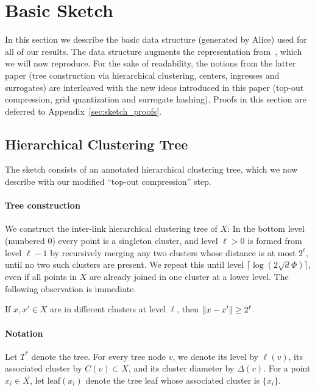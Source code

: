 
\section{Basic Sketch}\label{sec:sketch}

In this section we describe the basic data structure (generated by Alice) used for all of our results.
The data structure augments the representation from~\cite{indyk2017near}, which we will now reproduce.
For the sake of readability, the notions from the latter paper (tree construction via hierarchical clustering, centers, ingresses and surrogates) are interleaved with the new ideas introduced in this paper (top-out compression, grid quantization and surrogate hashing).
Proofs in this section are deferred to Appendix~\ref{sec:sketch_proofs}.


\subsection{Hierarchical Clustering Tree}
The sketch consists of an annotated hierarchical clustering tree, which we now describe with our modified ``top-out compression'' step.

\paragraph{Tree construction}
We construct the inter-link hierarchical clustering tree of $X$: In the bottom level (numbered $0$) every point is a singleton cluster, and level $\ell>0$ is formed from level $\ell-1$ by recursively merging any two clusters whose distance is at most $2^\ell$, until no two such clusters are present.
We repeat this until level $\lceil\log(2\sqrt d\Phi)\rceil$, even if all points in $X$ are already joined in one cluster at a lower level.
The following observation is immediate.
\begin{lemma}\label{lmm:separation}
If $x,x'\in X$ are in different clusters at level $\ell$, then $\lVert x-x'\rVert\geq2^\ell$.
\end{lemma}

\paragraph{Notation}
Let $T^*$ denote the tree.
For every tree node $v$, we denote its level by $\ell(v)$, its associated cluster by $C(v)\subset X$, and its cluster diameter by $\Delta(v)$. For a point $x_i\in X$, let $\mathrm{leaf}(x_i)$ denote the tree leaf whose associated cluster is $\{x_i\}$.


